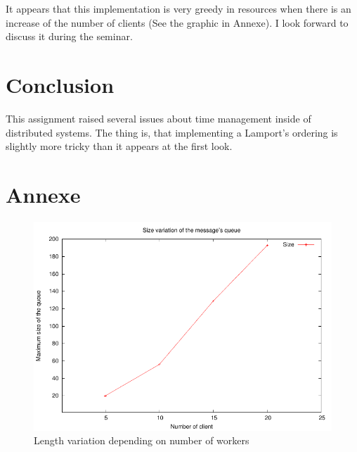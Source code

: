 \documentclass[a4paper, 11pt]{article}
\begin{document}
It appears that this implementation is very greedy in resources when there is an increase of the number of clients (See the graphic in Annexe). I look forward to discuss it during the seminar.

\section{Conclusion}
This assignment raised several issues about time management inside of distributed systems. The thing is, that implementing a Lamport's ordering is slightly more tricky than it appears at the first look.
\medskip

\section{Annexe}

\begin{figure}
  \begin{center}
    \includegraphics{size_queue}
    \caption{Length variation depending on number of workers}
    \label{fig:Size of Queue}
  \end{center}
\end{figure}
\end{document}
